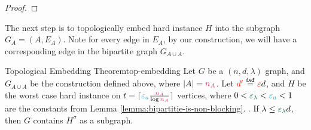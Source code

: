 \documentclass[11pt]{article}
\newcommand{\EnDeeLambda}{(n, d, \lambda)}
\newcommand{\Subdivision}[2]{{#1}^{#2}}
\newcommand{\epsilonA}{\textcolor{ballblue}{\epsilon_a}}
\newcommand{\epsilonL}{\textcolor{cadmiumgreen}{\epsilon_\lambda}}
\newcommand{\na}{\textcolor{razzmatazz}{n_A}}
\newcommand{\BipartiteG}{G_{A \cup A}}
\newcommand{\dApproxLower}{\textcolor{red}{d'}}
\begin{document}
\begin{proof}
%
%
%
%
%

\end{proof}


The next step is to topologically embed hard instance $H$ into the subgraph $G_A = (A, E_A)$.
Note for every edge in $E_A$, by our construction, we will have a corresponding edge in the bipartite graph $\BipartiteG$.

\begin{theorem}{Topological Embedding Theorem}{top-embedding}
Let $G$ be a $\EnDeeLambda$ graph, and $\BipartiteG$ be the construction defined above, where $|A| = \na$.
Let $\dApproxLower \Def \Eps d$, and $H$ be the worst case hard instance on $t = \lceil\epsilonA \frac{\na}{\log \na}\rceil$ vertices, where $0 < \epsilonL < \epsilonA <1$ are the constants from  Lemma \ref{lemma:bipartitie-is-non-blocking}.	
.
If $\lambda \leq \epsilonL d$, then $G$ contains $\Subdivision{H}{\sigma}$ as a subgraph.

\end{theorem}
\end{document}
